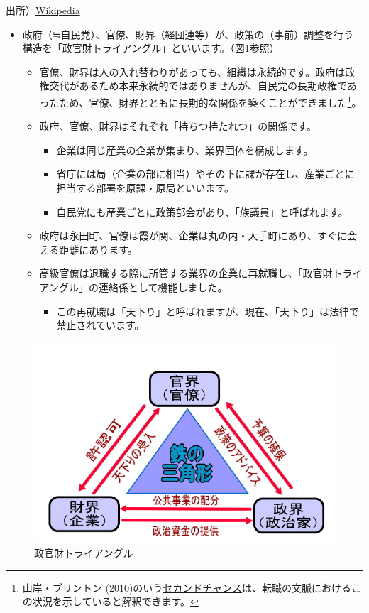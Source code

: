 \documentclass[
]{book}
\providecommand{\tightlist}{%
  \setlength{\itemsep}{0pt}\setlength{\parskip}{0pt}}
\begin{document}
出所）\href{https://ja.wikipedia.org/wiki/55\%E5\%B9\%B4\%E4\%BD\%93\%E5\%88\%B6}{Wikipedia}

\begin{itemize}
\item
  政府（≒自民党）、官僚、財界（経団連等）が、政策の（事前）調整を行う構造を「政官財トライアングル」といいます。（図\ref{fig:triangle}参照）

  \begin{itemize}
  \item
    官僚、財界は人の入れ替わりがあっても、組織は永続的です。政府は政権交代があるため本来永続的ではありませんが、自民党の長期政権であったため、官僚、財界とともに長期的な関係を築くことができました\footnote{山岸・ブリントン (2010)のいう\protect\hyperlink{labor}{セカンドチャンス}は、転職の文脈におけるこの状況を示していると解釈できます。}。
  \item
    政府、官僚、財界はそれぞれ「持ちつ持たれつ」の関係です。

    \begin{itemize}
    \item
      企業は同じ産業の企業が集まり、業界団体を構成します。
    \item
      省庁には局（企業の部に相当）やその下に課が存在し、産業ごとに担当する部署を原課・原局といいます。
    \item
      自民党にも産業ごとに政策部会があり、「族議員」と呼ばれます。
    \end{itemize}
  \item
    政府は永田町、官僚は霞が関、企業は丸の内・大手町にあり、すぐに会える距離にあります。
  \item
    高級官僚は退職する際に所管する業界の企業に再就職し、「政官財トライアングル」の連絡係として機能しました。

    \begin{itemize}
    \tightlist
    \item
      この再就職は「天下り」と呼ばれますが、現在、「天下り」は法律で禁止されています。
    \end{itemize}
  \end{itemize}
\end{itemize}

\begin{figure}
\includegraphics[width=960px]{triangle1} \caption{政官財トライアングル}\label{fig:triangle}
\end{figure}
\end{document}
